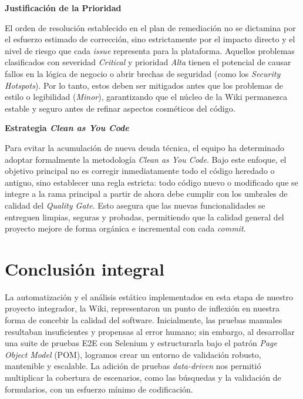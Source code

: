 \documentclass[12pt]{article}
\begin{document}
\vspace{0.4cm}

\textbf{Justificación de la Prioridad}

El orden de resolución establecido en el plan de remediación no se dictamina por el esfuerzo estimado de corrección, sino estrictamente por el impacto directo y el nivel de riesgo que cada \textit{issue} representa para la plataforma. Aquellos problemas clasificados con severidad \textit{Critical} y prioridad \textit{Alta} tienen el potencial de causar fallos en la lógica de negocio o abrir brechas de seguridad (como los \textit{Security Hotspots}). Por lo tanto, estos deben ser mitigados antes que los problemas de estilo o legibilidad (\textit{Minor}), garantizando que el núcleo de la Wiki permanezca estable y seguro antes de refinar aspectos cosméticos del código.

\textbf{Estrategia \textit{Clean as You Code}}

Para evitar la acumulación de nueva deuda técnica, el equipo ha determinado adoptar formalmente la metodología \textit{Clean as You Code}. Bajo este enfoque, el objetivo principal no es corregir inmediatamente todo el código heredado o antiguo, sino establecer una regla estricta: todo código nuevo o modificado que se integre a la rama principal a partir de ahora debe cumplir con los umbrales de calidad del \textit{Quality Gate}. Esto asegura que las nuevas funcionalidades se entreguen limpias, seguras y probadas, permitiendo que la calidad general del proyecto mejore de forma orgánica e incremental con cada \textit{commit}.



































\section{Conclusión integral}

La automatización y el análisis estático implementados en esta etapa de nuestro proyecto integrador, la Wiki, representaron un punto de inflexión en nuestra forma de concebir la calidad del software. Inicialmente, las pruebas manuales resultaban insuficientes y propensas al error humano; sin embargo, al desarrollar una suite de pruebas E2E con Selenium y estructurarla bajo el patrón \textit{Page Object Model} (POM), logramos crear un entorno de validación robusto, mantenible y escalable. La adición de pruebas \textit{data-driven} nos permitió multiplicar la cobertura de escenarios, como las búsquedas y la validación de formularios, con un esfuerzo mínimo de codificación.
\end{document}
